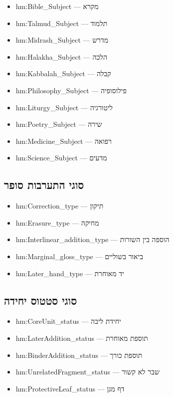\documentclass[12pt,a4paper]{article}
\newcommand{\new}[1]{\textcolor{newaddition}{#1}}
\begin{document}
\begin{itemize}
\item hm:Bible\_Subject — מקרא
\item hm:Talmud\_Subject — תלמוד
\item hm:Midrash\_Subject — מדרש
\item hm:Halakha\_Subject — הלכה
\item hm:Kabbalah\_Subject — קבלה
\item hm:Philosophy\_Subject — פילוסופיה
\item hm:Liturgy\_Subject — ליטורגיה
\item hm:Poetry\_Subject — שירה
\item hm:Medicine\_Subject — רפואה
\item hm:Science\_Subject — מדעים
\end{itemize}

\subsection{\new{סוגי התערבות סופר}}

\begin{itemize}
\item \new{hm:Correction\_type — תיקון}
\item \new{hm:Erasure\_type — מחיקה}
\item \new{hm:Interlinear\_addition\_type — הוספה בין השורות}
\item \new{hm:Marginal\_gloss\_type — ביאור בשוליים}
\item \new{hm:Later\_hand\_type — יד מאוחרת}
\end{itemize}

\subsection{\new{סוגי סטטוס יחידה}}

\begin{itemize}
\item \new{hm:CoreUnit\_status — יחידת ליבה}
\item \new{hm:LaterAddition\_status — תוספת מאוחרת}
\item \new{hm:BinderAddition\_status — תוספת כורך}
\item \new{hm:UnrelatedFragment\_status — שבר לא קשור}
\item \new{hm:ProtectiveLeaf\_status — דף מגן}
\end{itemize}
\end{document}
